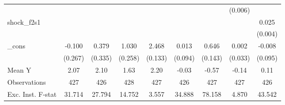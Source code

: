 {\begin{tabular}{l*{8}{c}}
            &                     &                     &                     &                     &                     &                     &     (0.006)         &                     \\
\addlinespace
shock\_f2s1  &                     &                     &                     &                     &                     &                     &                     &       0.025\sym{***}\\
            &                     &                     &                     &                     &                     &                     &                     &     (0.004)         \\
\addlinespace
\_cons      &      -0.100         &       0.379         &       1.030\sym{***}&       2.468\sym{***}&       0.013         &       0.646\sym{***}&       0.002         &      -0.008         \\
            &     (0.267)         &     (0.335)         &     (0.258)         &     (0.133)         &     (0.094)         &     (0.143)         &     (0.033)         &     (0.095)         \\
\midrule
Mean Y      &        2.07         &        2.10         &        1.63         &        2.20         &       -0.03         &       -0.57         &       -0.14         &        0.11         \\
Observations&         427         &         426         &         428         &         427         &         426         &         427         &         427         &         426         \\
Exc. Inst. F-stat&      31.714         &      27.794         &      14.752         &       3.557         &      34.888         &      78.158         &       4.870         &      43.542         \\
\bottomrule
\end{tabular}
}
